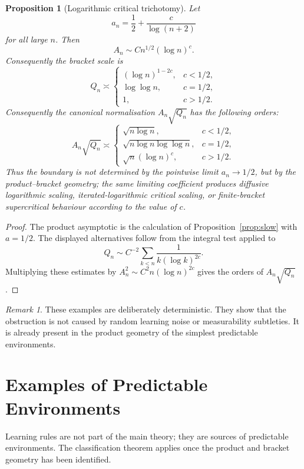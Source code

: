\documentclass[11pt]{article}
\newtheorem{proposition}{Proposition}
\theoremstyle{definition}
\theoremstyle{remark}
\newtheorem{remark}{Remark}
\newcommand{\1}{\mathbf{1}}
\begin{document}
\begin{proposition}[Logarithmic critical trichotomy]\label{prop:critical-window}
Let
\[
  a_n=\frac12+\frac{c}{\log(n+2)}
\]
for all large \(n\). Then
\[
  A_n\sim C n^{1/2}(\log n)^c.
\]
Consequently the bracket scale is
\[
  Q_n\asymp
  \begin{cases}
    (\log n)^{1-2c}, & c<1/2,\\
    \log\log n, & c=1/2,\\
    1, & c>1/2.
  \end{cases}
\]
Consequently the canonical normalisation \(A_n\sqrt{Q_n}\) has the following
orders:
\[
  A_n\sqrt{Q_n}\asymp
  \begin{cases}
    \sqrt{n\log n}, & c<1/2,\\
    \sqrt{n\log n\log\log n}, & c=1/2,\\
    \sqrt n(\log n)^c, & c>1/2.
  \end{cases}
\]
Thus the boundary is not determined by the pointwise limit \(a_n\to1/2\), but by
the product--bracket geometry; the same limiting coefficient produces diffusive
logarithmic scaling, iterated-logarithmic critical scaling, or finite-bracket
supercritical behaviour according to the value of \(c\).
\end{proposition}

\begin{proof}
The product asymptotic is the calculation of Proposition~\ref{prop:slow} with
\(a=1/2\). The displayed alternatives follow from the integral test applied to
\[
  Q_n\sim C^{-2}\sum_{k<n}\frac1{k(\log k)^{2c}}.
\]
Multiplying these estimates by \(A_n^2\sim C^2n(\log n)^{2c}\) gives the
orders of \(A_n\sqrt{Q_n}\).
\end{proof}

\begin{remark}
These examples are deliberately deterministic. They show that the obstruction is
not caused by random learning noise or measurability subtleties. It is already
present in the product geometry of the simplest predictable environments.
\end{remark}

\section{Examples of Predictable Environments}\label{sec:examples}

Learning rules are not part of the main theory; they are sources of predictable
environments. The classification theorem applies once the product and bracket
geometry has been identified.
\end{document}
